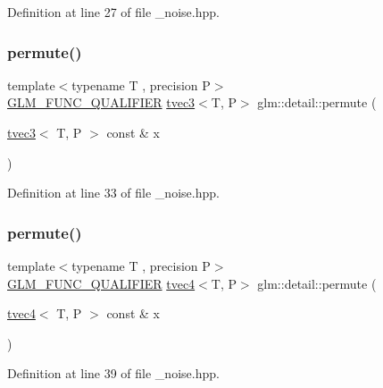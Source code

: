 Definition at line 27 of file \+\_\+noise.\+hpp.

\mbox{\label{namespaceglm_1_1detail_a79bd7b1e8eeb2a6914389d3fbece3956}} 
\subsubsection{\texorpdfstring{permute()}{permute()}\hspace{0.1cm}{\footnotesize\ttfamily [3/4]}}
{\footnotesize\ttfamily template$<$typename T , precision P$>$ \\
\mbox{\hyperlink{setup_8hpp_a33fdea6f91c5f834105f7415e2a64407}{G\+L\+M\+\_\+\+F\+U\+N\+C\+\_\+\+Q\+U\+A\+L\+I\+F\+I\+ER}} \mbox{\hyperlink{structglm_1_1tvec3}{tvec3}}$<$T, P$>$ glm\+::detail\+::permute (\begin{DoxyParamCaption}\item[{\mbox{\hyperlink{structglm_1_1tvec3}{tvec3}}$<$ T, P $>$ const \&}]{x }\end{DoxyParamCaption})}



Definition at line 33 of file \+\_\+noise.\+hpp.

\mbox{\label{namespaceglm_1_1detail_a06a762db6f033766a27a266d5d120105}} 
\subsubsection{\texorpdfstring{permute()}{permute()}\hspace{0.1cm}{\footnotesize\ttfamily [4/4]}}
{\footnotesize\ttfamily template$<$typename T , precision P$>$ \\
\mbox{\hyperlink{setup_8hpp_a33fdea6f91c5f834105f7415e2a64407}{G\+L\+M\+\_\+\+F\+U\+N\+C\+\_\+\+Q\+U\+A\+L\+I\+F\+I\+ER}} \mbox{\hyperlink{structglm_1_1tvec4}{tvec4}}$<$T, P$>$ glm\+::detail\+::permute (\begin{DoxyParamCaption}\item[{\mbox{\hyperlink{structglm_1_1tvec4}{tvec4}}$<$ T, P $>$ const \&}]{x }\end{DoxyParamCaption})}



Definition at line 39 of file \+\_\+noise.\+hpp.

